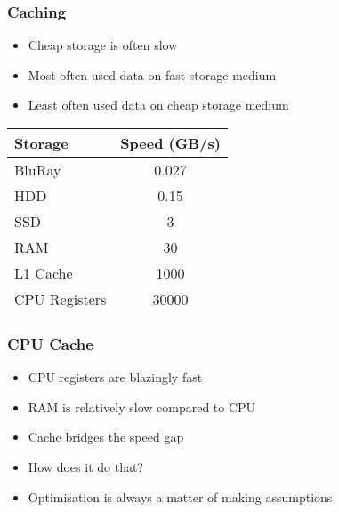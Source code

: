 \begin{frame}
\begin{center}
  \end{center}
\end{frame}

\begin{frame}
  \frametitle{Caching}
  \begin{itemize}
    \item Cheap storage is often slow
    \item Most often used data on fast storage medium
    \item Least often used data on cheap storage medium
  \end{itemize}
  \begin{center}
    \begin{tabular}{lc}
      \textbf{Storage} & \textbf{Speed (GB/s)} \\
      \toprule
      BluRay & 0.027 \\
      HDD & 0.15 \\
      SSD & \SI{3}{} \\
      RAM & \SI{30}{} \\
      L1 Cache & \SI{1000}{} \\
      CPU Registers & \SI{30000}{}
    \end{tabular}
  \end{center}
\end{frame}

\begin{frame}
  \frametitle{CPU Cache}
  \begin{itemize}
    \item CPU registers are blazingly fast
    \item RAM is relatively slow compared to CPU
    \item Cache bridges the speed gap
    \item How does it do that?
    \item Optimisation is always a matter of making assumptions
  \end{itemize}
\end{frame}






